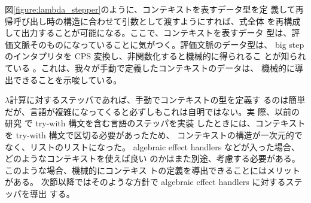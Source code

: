 図\ref{figure:lambda_stepper}のように、コンテキストを表すデータ型を定
義して再帰呼び出し時の構造に合わせて引数として渡すようにすれば、式全体
を再構成して出力することが可能になる。ここで、コンテキストを表すデータ
型は、評価文脈そのものになっていることに気がつく。評価文脈のデータ型は、
big step のインタプリタを CPS 変換し、非関数化すると機械的に得られるこ
とが知られている \cite{AK2010, 10.1145/1411204.1411206}。これは、我々が手動で定義したコンテキストのデータは、
機械的に導出できることを示唆している。

$\lambda$計算に対するステッパであれば、手動でコンテキストの型を定義す
るのは簡単だが、言語が複雑になってくると必ずしもこれは自明ではない。実
際、以前の研究 \cite{FCA19} で try-with 構文を含む言語のステッパを実装
したときには、コンテキストを try-with 構文で区切る必要があったため、
コンテキストの構造が一次元的でなく、リストのリストになった。
algebraic effect handlers などが入った場合、どのようなコンテキストを使えば良い
のかはまた別途、考慮する必要がある。このような場合、機械的にコンテキス
トの定義を導出できることにはメリットがある。
次節以降ではそのような方針で algebraic effect handlers に対するステッパを導出
する。


